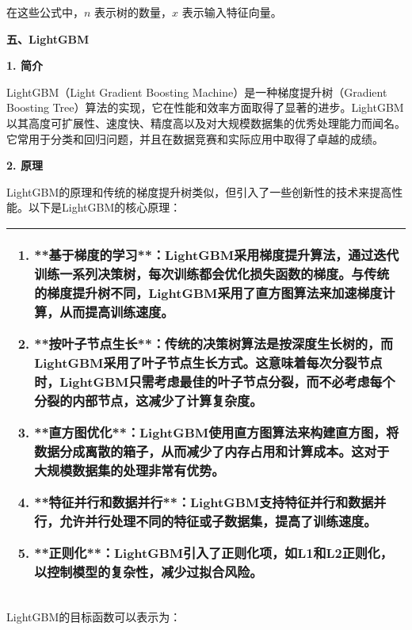 \documentclass[bwprint]{gmcmthesis}
\begin{document}
				在这些公式中，$n$ 表示树的数量，$x$ 表示输入特征向量。
				
				\textbf{五、LightGBM}
				
				\textbf{1. 简介}
				
				LightGBM（Light Gradient Boosting Machine）是一种梯度提升树（Gradient Boosting Tree）算法的实现，它在性能和效率方面取得了显著的进步。LightGBM以其高度可扩展性、速度快、精度高以及对大规模数据集的优秀处理能力而闻名。它常用于分类和回归问题，并且在数据竞赛和实际应用中取得了卓越的成绩。
				
				\textbf{2. 原理}
				
				LightGBM的原理和传统的梯度提升树类似，但引入了一些创新性的技术来提高性能。以下是LightGBM的核心原理：
				
				\begin{table}[H]
					\centering
					\begin{tabularx}{\textwidth}{|X|}
						\hline
						\begin{enumerate}
							\item **基于梯度的学习**：LightGBM采用梯度提升算法，通过迭代训练一系列决策树，每次训练都会优化损失函数的梯度。与传统的梯度提升树不同，LightGBM采用了直方图算法来加速梯度计算，从而提高训练速度。
							
							\item **按叶子节点生长**：传统的决策树算法是按深度生长树的，而LightGBM采用了叶子节点生长方式。这意味着每次分裂节点时，LightGBM只需考虑最佳的叶子节点分裂，而不必考虑每个分裂的内部节点，这减少了计算复杂度。
							
							\item **直方图优化**：LightGBM使用直方图算法来构建直方图，将数据分成离散的箱子，从而减少了内存占用和计算成本。这对于大规模数据集的处理非常有优势。
							
							\item **特征并行和数据并行**：LightGBM支持特征并行和数据并行，允许并行处理不同的特征或子数据集，提高了训练速度。
							
							\item **正则化**：LightGBM引入了正则化项，如L1和L2正则化，以控制模型的复杂性，减少过拟合风险。
							
						\end{enumerate}\\
						\hline
					\end{tabularx}
				\end{table}
				
				LightGBM的目标函数可以表示为：
				
\end{document}
